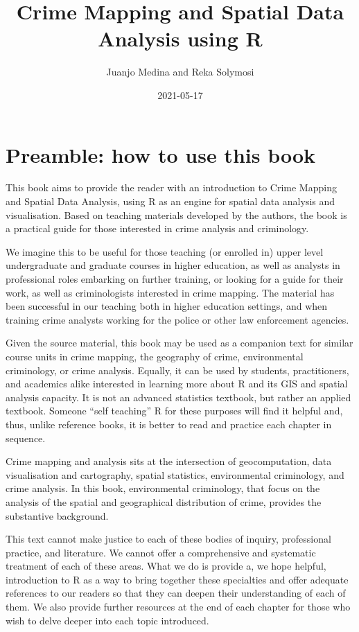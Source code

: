 \documentclass[
]{book}
\title{Crime Mapping and Spatial Data Analysis using R}
\author{Juanjo Medina and Reka Solymosi}
\date{2021-05-17}
\begin{document}
\maketitle

{
\setcounter{tocdepth}{1}
\tableofcontents
}
\hypertarget{preamble-how-to-use-this-book}{%
\chapter*{Preamble: how to use this book}\label{preamble-how-to-use-this-book}}

This book aims to provide the reader with an introduction to Crime Mapping and Spatial Data Analysis, using R as an engine for spatial data analysis and visualisation. Based on teaching materials developed by the authors, the book is a practical guide for those interested in crime analysis and criminology.

We imagine this to be useful for those teaching (or enrolled in) upper level undergraduate and graduate courses in higher education, as well as analysts in professional roles embarking on further training, or looking for a guide for their work, as well as criminologists interested in crime mapping. The material has been successful in our teaching both in higher education settings, and when training crime analysts working for the police or other law enforcement agencies.

Given the source material, this book may be used as a companion text for similar course units in crime mapping, the geography of crime, environmental criminology, or crime analysis. Equally, it can be used by students, practitioners, and academics alike interested in learning more about R and its GIS and spatial analysis capacity. It is not an advanced statistics textbook, but rather an applied textbook. Someone ``self teaching'' R for these purposes will find it helpful and, thus, unlike reference books, it is better to read and practice each chapter in sequence.

Crime mapping and analysis sits at the intersection of geocomputation, data visualisation and cartography, spatial statistics, environmental criminology, and crime analysis. In this book, environmental criminology, that focus on the analysis of the spatial and geographical distribution of crime, provides the substantive background.

This text cannot make justice to each of these bodies of inquiry, professional practice, and literature. We cannot offer a comprehensive and systematic treatment of each of these areas. What we do is provide a, we hope helpful, introduction to R as a way to bring together these specialties and offer adequate references to our readers so that they can deepen their understanding of each of them. We also provide further resources at the end of each chapter for those who wish to delve deeper into each topic introduced.
\end{document}
